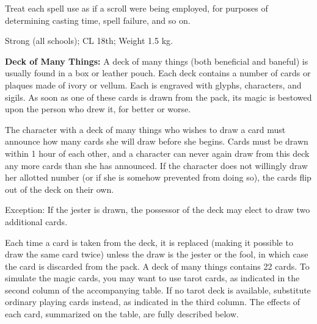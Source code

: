 Treat each spell use as if a scroll were being employed, for purposes of determining casting time, spell failure, and so on.

Strong (all schools); CL 18th; Weight 1.5 kg.

\textbf{Deck of Many Things:} A deck of many things (both beneficial and baneful) is usually found in a box or leather pouch. Each deck contains a number of cards or plaques made of ivory or vellum. Each is engraved with glyphs, characters, and sigils. As soon as one of these cards is drawn from the pack, its magic is bestowed upon the person who drew it, for better or worse.

The character with a deck of many things who wishes to draw a card must announce how many cards she will draw before she begins. Cards must be drawn within 1 hour of each other, and a character can never again draw from this deck any more cards than she has announced. If the character does not willingly draw her allotted number (or if she is somehow prevented from doing so), the cards flip out of the deck on their own.

Exception: If the jester is drawn, the possessor of the deck may elect to draw two additional cards.

Each time a card is taken from the deck, it is replaced (making it possible to draw the same card twice) unless the draw is the jester or the fool, in which case the card is discarded from the pack. A deck of many things contains 22 cards. To simulate the magic cards, you may want to use tarot cards, as indicated in the second column of the accompanying table. If no tarot deck is available, substitute ordinary playing cards instead, as indicated in the third column. The effects of each card, summarized on the table, are fully described below.

